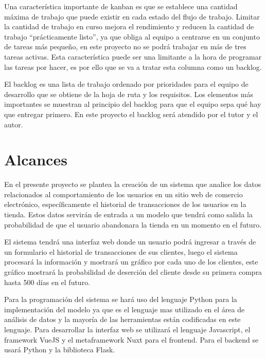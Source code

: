 	Una característica importante de kanban es que se establece una cantidad máxima de trabajo que puede existir en cada estado del flujo de trabajo. Limitar la cantidad de trabajo en curso mejora el rendimiento y reducen la cantidad de trabajo “prácticamente listo”, ya que obliga al equipo a centrarse en un conjunto de tareas más pequeño, en este proyecto no se podrá trabajar en más de tres tareas activas. Esta característica puede ser una limitante a la hora de programar las tareas por hacer, es por ello que se va a tratar esta columna como un backlog.


	El backlog es una lista de trabajo ordenado por prioridades para el equipo de desarrollo que se obtiene de la hoja de ruta y los requisitos. Los elementos más importantes se muestran al principio del backlog para que el equipo sepa qué hay que entregar primero. En este proyecto el backlog será atendido por el tutor y el autor.

\section{Alcances}

En el presente proyecto se plantea la creación de un sistema que analice los datos relacionados al comportamiento de los usuarios en un sitio web de comercio electrónico, específicamente el historial de transacciones de los usuarios en la tienda. Estos datos servirán de entrada a un modelo que tendrá como salida la probabilidad de que el usuario abandonara la tienda en un momento en el futuro.

El sistema tendrá una interfaz web donde un usuario podrá ingresar a través de un formulario el historial de transacciones de sus clientes, luego el sistema procesará la información y mostrará un gráfico por cada uno de los clientes, este gráfico mostrará la probabilidad de deserción del cliente desde su primera compra hasta 500 días en el futuro.

Para la programación del sistema se hará uso del lenguaje Python para la implementación del modelo ya que es el lenguaje mas utilizado en el área de análisis de datos y la mayoría de las herramientas están codificadas en este lenguaje. Para desarrollar la interfaz web se utilizará el lenguaje Javascript, el framework VueJS y el metaframework Nuxt para el frontend. Para el backend se usará Python y la biblioteca Flask.  